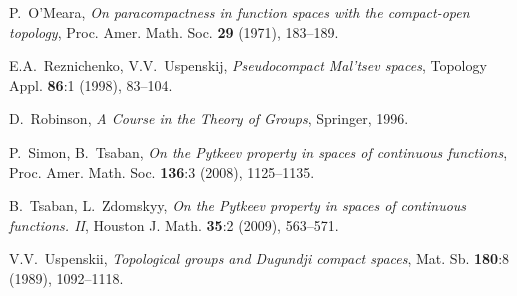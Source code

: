 \documentclass{amsart}
\theoremstyle{definition}
\begin{document}
\begin{thebibliography}{}
 P.~O'Meara, {\em  On paracompactness in function spaces with the compact-open topology}, Proc. Amer. Math. Soc. \textbf{29} (1971), 183--189.

 E.A.~Reznichenko, V.V.~Uspenskij, {\em Pseudocompact Mal'tsev spaces}, Topology Appl. {\bf86}:1 (1998), 83--104.

 D.~Robinson, {\em A Course in the Theory of Groups}, Springer, 1996.

 P.~Simon, B.~Tsaban, {\em On the Pytkeev property in spaces of continuous functions},
Proc. Amer. Math. Soc. {\bf 136}:3 (2008), 1125--1135.

 B.~Tsaban, L.~Zdomskyy, {\em On the Pytkeev property in spaces of continuous functions. II}, Houston J. Math. {\bf 35}:2 (2009), 563--571.

  V.V.~Uspenskii, {\em Topological groups and Dugundji compact spaces}, Mat. Sb. {\bf 180}:8  (1989), 1092--1118.

\end{thebibliography}
\end{document}
